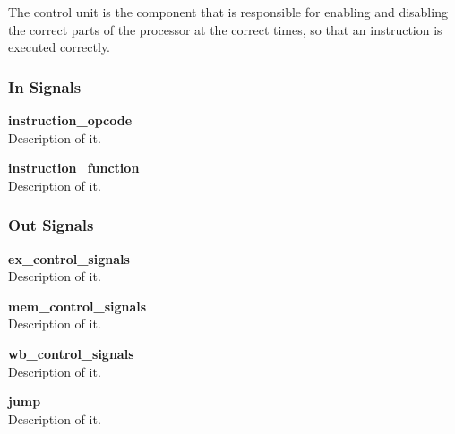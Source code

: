 The control unit is the component that is responsible for enabling and disabling the correct parts of the processor at the correct times, so that an instruction is executed correctly.

\subsubsection{In Signals}

\begin{description}
\item{\textbf{instruction\_opcode}} \\
Description of it.
\item{\textbf{instruction\_function}} \\
Description of it.
\end{description}

\subsubsection{Out Signals}

\begin{description}
\item{\textbf{ex\_control\_signals}} \\
Description of it.
\item{\textbf{mem\_control\_signals}} \\
Description of it.
\item{\textbf{wb\_control\_signals}} \\
Description of it.
\item{\textbf{jump}} \\
Description of it.
\end{description}

